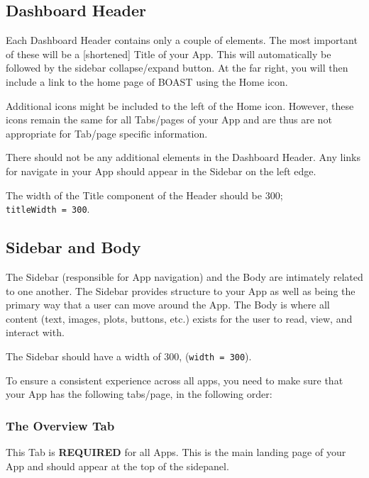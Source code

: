 \documentclass[
]{book}
\begin{document}
\hypertarget{dashboard-header}{%
\subsection{Dashboard Header}\label{dashboard-header}}

Each Dashboard Header contains only a couple of elements. The most important of these will be a {[}shortened{]} Title of your App. This will automatically be followed by the sidebar collapse/expand button. At the far right, you will then include a link to the home page of BOAST using the Home icon.

Additional icons might be included to the left of the Home icon. However, these icons remain the same for all Tabs/pages of your App and are thus are not appropriate for Tab/page specific information.

There should not be any additional elements in the Dashboard Header. Any links for navigate in your App should appear in the Sidebar on the left edge.

The width of the Title component of the Header should be 300; \texttt{titleWidth\ =\ 300}.

\hypertarget{sidebar-and-body}{%
\subsection{Sidebar and Body}\label{sidebar-and-body}}

The Sidebar (responsible for App navigation) and the Body are intimately related to one another. The Sidebar provides structure to your App as well as being the primary way that a user can move around the App. The Body is where all content (text, images, plots, buttons, etc.) exists for the user to read, view, and interact with.

The Sidebar should have a width of 300, (\texttt{width\ =\ 300}).

To ensure a consistent experience across all apps, you need to make sure that your App has the following tabs/page, in the following order:

\hypertarget{the-overview-tab}{%
\subsubsection{The Overview Tab}\label{the-overview-tab}}

This Tab is \textbf{REQUIRED} for all Apps. This is the main landing page of your App and should appear at the top of the sidepanel.
\end{document}
